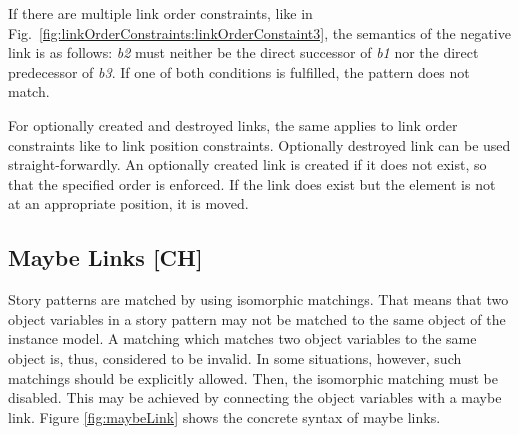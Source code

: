 {If there are multiple link order constraints, like in Fig.~\ref{fig:linkOrderConstraints:linkOrderConstaint3}, the semantics of the negative link is as follows: \emph{b2} must neither be the direct successor of \emph{b1} nor the direct predecessor of \emph{b3}. If one of both conditions is fulfilled, the pattern does not match.


For optionally created and destroyed links, the same applies to link order constraints like to link position constraints. Optionally destroyed link can be used straight-forwardly. An optionally created link is created if it does not exist, so that the specified order is enforced. If the link does exist but the element is not at an appropriate position, it is moved.
} %

\subsection{Maybe Links [CH]}
\label{sec:StoryPatterns:specialLinks:maybeLink}

Story patterns are matched by using isomorphic matchings. That means that two object variables in a story pattern may not be matched to the same object of the instance model. A matching which matches two object variables to the same object is, thus, considered to be invalid. In some situations, however, such matchings should be explicitly allowed. Then, the isomorphic matching must be disabled. This may be achieved by connecting the object variables with a maybe link. Figure \ref{fig:maybeLink} shows the concrete syntax of maybe links. 


